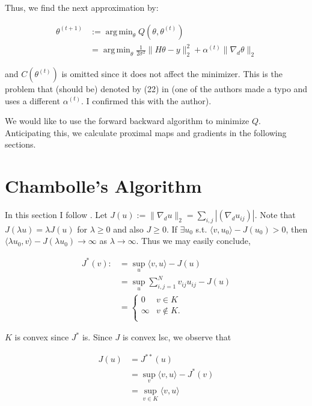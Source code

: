 \documentclass[paper=a4, fontsize=11pt]{scrartcl} %
\DeclareMathOperator*{\argmin}{arg\,min}
\numberwithin{equation}{section} %
\numberwithin{figure}{section} %
\numberwithin{table}{section} %
\newcommand{\grad}{\nabla_{d} }
\begin{document}
Thus, we find the next approximation by:

\begin{align*}
  \theta^{(t+1)} &:= \argmin_{\theta} Q(\theta, \theta^{(t)}) \\
  &= \argmin_{\theta}  \frac{1}{2\sigma^2} \|H\theta - y\|_2^2 + \alpha^{(t)} \|\grad \theta\|_2
\end{align*}

and $C(\theta^{(t)})$ is omitted since it does not affect the
minimizer. This is the problem that (should be) denoted by (22) in
\cite{green2015bayesian} (one of the authors made a typo and uses a
different $\alpha^{(t)}$. I confirmed this with the author).

We would like to use the forward backward algorithm
\cite{combettes2011splitting} to minimize $Q$. Anticipating this, we
calculate proximal maps and gradients in the following sections.

\section{Chambolle's Algorithm}
In this section I follow \cite{chambolle2004algorithm}. Let $J(u) :=
\|\grad u \|_2 = \sum_{i,j} |(\grad u_{ij})|$.  Note that $J(\lambda
u) = \lambda J(u)$ for $\lambda \geq 0$ and also $J \geq 0$. If
$\exists u_0$ s.t.  $\langle v, u_0 \rangle - J(u_0) > 0$, then
$\langle \lambda u_0, v \rangle - J(\lambda u_0) \to \infty$ as
$\lambda \to \infty$. Thus we may easily conclude,

\begin{align*}
  J^{*}(v) :&= \sup_{u} \langle v, u \rangle - J(u) \\
  &= \sup_{u} \sum_{i,j = 1}^{N} v_{ij} u_{ij} - J( u ) \\ 
  &= 
  \begin{cases}
    0 & v \in K\\
    \infty & v \not \in K.\\ 
  \end{cases}
\end{align*}
 
$K$ is convex since $J^{*}$ is. Since $J$ is convex lsc, we observe
that

\begin{align*}
  J(u) &= J^{**}(u) \\ 
  &= \sup_{v} \langle v, u \rangle - J^{*}(v) \\
  &= \sup_{v\in K} \langle v, u \rangle
\end{align*}
\end{document}
